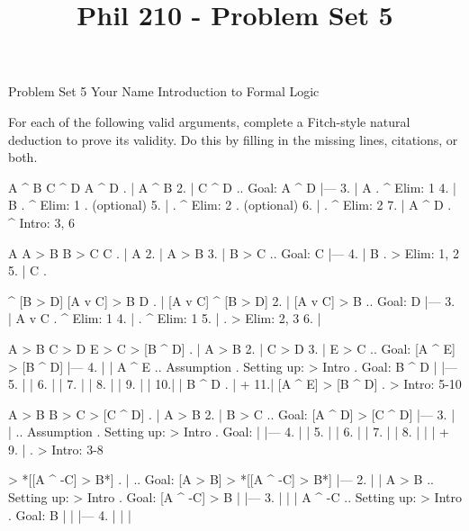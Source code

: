 
\title{Phil 210 - Problem Set 5}

\heading
Problem Set 5
Your Name
Introduction to Formal Logic
\endheading

For each of the following valid arguments, complete a Fitch-style natural deduction to prove its validity. Do this by filling in the missing lines, citations, or both.

\problems
{}
\argument
 A ^ B
 C ^ D
\argumentline
 A ^ D
\endargument
	\answer
	. | A ^ B
	 2. | C ^ D  ..  Goal: A ^ D
	    |---
	 3. | A      .  ^ Elim: 1
	 4. | B      .  ^ Elim: 1  .  (optional)
	 5. |        .  ^ Elim: 2  .  (optional)
	 6. |        .  ^ Elim: 2
	 7. | A ^ D  .  ^ Intro: 3, 6
	\endfitchproof
	\endanswer

\argument
 A
 A > B
 B > C
\argumentline
 C
\endargument
	\answer
	. | A
	 2. | A > B
	 3. | B > C  ..  Goal: C
	    |---
	 4. | B      .  > Elim: 1, 2
	 5. | C      .  
	\endfitchproof
	\endanswer

\argument
 [A v C] ^ [B > D]
 [A v C] > B
\argumentline
 D
\endargument
	\answer
	. | [A v C] ^ [B > D]
	 2. | [A v C] > B        ..  Goal: D
	    |---
	 3. | A v C              .  ^ Elim: 1
	 4. |                    .  ^ Elim: 1
	 5. |                    .  > Elim: 2, 3
	 6. | 
	\endfitchproof
	\endanswer

\argument
 A > B
 C > D
 E > C
\argumentline
 [A ^ E] > [B ^ D]
\endargument
	\answer
	. | A > B
	 2. | C > D
	 3. | E > C      ..  Goal: [A ^ E] > [B ^ D]
	    |---
	 4. |   | A ^ E  ..  Assumption  .  Setting up: > Intro  .  Goal: B ^ D
	    |   |---
	 5. |   | 
	 6. |   | 
	 7. |   | 
	 8. |   | 
	 9. |   | 
	 10.|   | B ^ D   .  
	    |   +
	 11.| [A ^ E] > [B ^ D]  .  > Intro: 5-10
	\endfitchproof
	\endanswer

\argument
 A > B
 B > C
\argumentline
 [A ^ D] > [C ^ D]
\endargument
	\answer
	. | A > B
	 2. | B > C      ..  Goal: [A ^ D] > [C ^ D]
	    |---
	 3. |   |        ..  Assumption  .  Setting up: > Intro  .  Goal: 
	    |   |---
	 4. |   | 
	 5. |   | 
	 6. |   | 
	 7. |   | 
	 8. |   | 
	    |   +
	 9. |            .  > Intro: 3-8
	\endfitchproof
	\endanswer

\argument
\argumentline
 [A > B] > *[[A ^ -C] > B*]
\endargument
	\answer
	. |                 ..  Goal: [A > B] > *[[A ^ -C] > B*]
	    |---
	 2. |   | A > B       ..  Setting up: > Intro  .  Goal: [A ^ -C] > B
	    |   |---
	 3. |   |   | A ^ -C  ..  Setting up: > Intro  .  Goal: B
	    |   |   |---
	 4. |   |   | 
	\endfitchproof
	\endanswer

\endproblems
\bye

